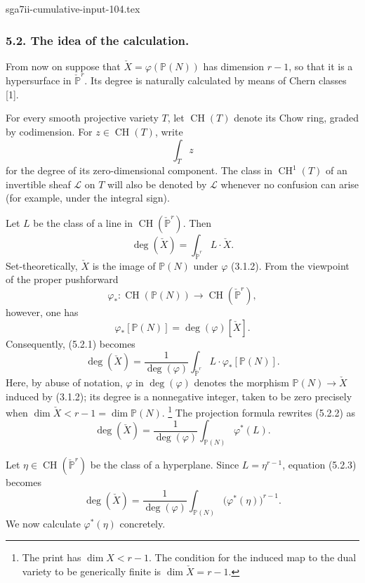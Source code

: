 \begin{filecontents*}{sga7ii-cumulative-input-104.tex}
\subsubsection*{5.2. The idea of the calculation.}

From now on suppose that
$\check X=\varphi(\mathbb P(N))$ has dimension $r-1$, so that it is a
hypersurface in $\check{\mathbb P}^{r}$.  Its degree is naturally
calculated by means of Chern classes [1].

For every smooth projective variety $T$, let $\operatorname{CH}(T)$
denote its Chow ring, graded by codimension.  For
$z\in\operatorname{CH}(T)$, write
\[
\int_T z
\]
for the degree of its zero-dimensional component.  The class in
$\operatorname{CH}^1(T)$ of an invertible sheaf $\mathcal L$ on $T$
will also be denoted by $\mathcal L$ whenever no confusion can arise
(for example, under the integral sign).

Let $L$ be the class of a line in
$\operatorname{CH}(\check{\mathbb P}^{r})$.  Then
\begin{equation}\tag{5.2.1}
\deg(\check X)
=\int_{\check{\mathbb P}^{r}}L\cdot\check X.
\end{equation}
Set-theoretically, $\check X$ is the image of $\mathbb P(N)$ under
$\varphi$ (3.1.2).  From the viewpoint of the proper pushforward
\[
\varphi_*:\operatorname{CH}(\mathbb P(N))
\longrightarrow\operatorname{CH}(\check{\mathbb P}^{r}),
\]
however, one has
\[
\varphi_*[\mathbb P(N)]=\deg(\varphi)[\check X].
\]
Consequently, (5.2.1) becomes
\begin{equation}\tag{5.2.2}
\deg(\check X)
=\frac{1}{\deg(\varphi)}
\int_{\check{\mathbb P}^{r}}L\cdot\varphi_*[\mathbb P(N)].
\end{equation}
Here, by abuse of notation, $\varphi$ in $\deg(\varphi)$ denotes the
morphism $\mathbb P(N)\to\check X$ induced by (3.1.2); its degree is a
nonnegative integer, taken to be zero precisely when
$\dim\check X<r-1=\dim\mathbb P(N)$.
\footnote{The print has $\dim X<r-1$.  The condition for the induced
map to the dual variety to be generically finite is
$\dim\check X=r-1$.}
The projection formula rewrites (5.2.2) as
\begin{equation}\tag{5.2.3}
\deg(\check X)
=\frac{1}{\deg(\varphi)}
\int_{\mathbb P(N)}\varphi^*(L).
\end{equation}

Let $\eta\in\operatorname{CH}(\check{\mathbb P}^{r})$ be the class of
a hyperplane.  Since $L=\eta^{r-1}$, equation (5.2.3) becomes
\begin{equation}\tag{5.2.4}
\deg(\check X)
=\frac{1}{\deg(\varphi)}
\int_{\mathbb P(N)}\bigl(\varphi^*(\eta)\bigr)^{r-1}.
\end{equation}
We now calculate $\varphi^*(\eta)$ concretely.


\end{filecontents*}

